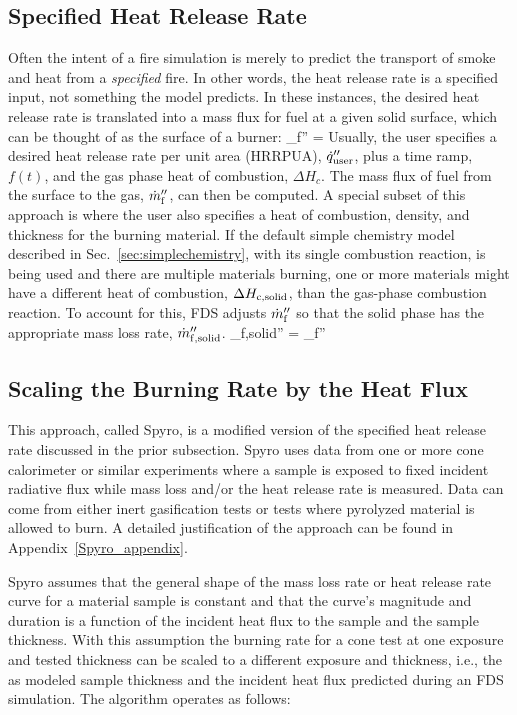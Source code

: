 \subsection{Specified Heat Release Rate}

Often the intent of a fire simulation is merely to predict the transport of smoke and heat from a {\em specified} fire. In other words, the heat release rate is a specified input, not something the model predicts. In these instances, the desired heat release rate is translated into a mass flux for fuel at a given solid surface, which can be thought of as the surface of a burner:
\be
   \dm_{\rm f}'' = 
\ee
Usually, the user specifies a desired heat release rate per unit area (HRRPUA), $\dot{q}_{\rm user}''$, plus a time ramp, $f(t)$, and the gas phase heat of combustion, $\Delta H_{\si{c}}$. The mass flux of fuel from the surface to the gas, $\dot{m}_{\rm f}''$, can then be computed. A special subset of this approach is where the user also specifies a heat of combustion, density, and thickness for the burning material. If the default simple chemistry model described in Sec.~\ref{sec:simplechemistry}, with its single combustion reaction, is being used and there are multiple materials burning, one or more materials might have a different heat of combustion, $\Delta H_{\si{c}{\rm ,solid}}$, than the gas-phase combustion reaction. To account for this, FDS adjusts $\dot{m}_{\rm f}''$ so that the solid phase has the appropriate mass loss rate, $\dot{m}_{\rm f,solid}''$.
\be
\dm_{\rm f,solid}'' = \dm_{\rm f}'' 
\ee

\subsection{Scaling the Burning Rate by the Heat Flux}
\label{spyro_algorithm}

This approach, called Spyro, is a modified version of the specified heat release rate discussed in the prior subsection. Spyro uses data from one or more cone calorimeter or similar experiments where a sample is exposed to fixed incident radiative flux while mass loss and/or the heat release rate is measured. Data can come from either inert gasification tests or tests where pyrolyzed material is allowed to burn. A detailed justification of the approach can be found in Appendix~\ref{Spyro_appendix}.


Spyro assumes that the general shape of the mass loss rate or heat release rate curve for a material sample is constant and that the curve's magnitude and duration is a function of the incident heat flux to the sample and the sample thickness. With this assumption the burning rate for a cone test at one exposure and tested thickness can be scaled to a different exposure and thickness, i.e., the as modeled sample thickness and the incident heat flux predicted during an FDS simulation. The algorithm operates as follows:

